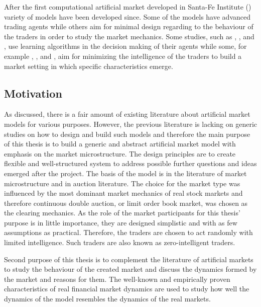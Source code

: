 After the first computational artificial market developed in Santa-Fe Institute
(\citet{SantaFe94}) variety of models have been developed since. Some of the
models have advanced trading agents while others aim for minimal design 
regarding to the behaviour of the traders in order to study the market
mechanics. Some studies, such as \citet{GOYKHMAN20181729}, \citet{IZUMI200535},
\citet{Reinforcement09} and \citet{YEH20102089}, use learning algorithms in the decision making of 
their agents while some, for example \citet{God93}, \citet{Jam96}, \citet{Genoa01} and \citet{Raberto05}, 
aim for minimizing the intelligence of the traders to build a market setting in which
specific characteristics emerge. %



\subsection{Motivation}

As discussed, there is a fair amount of existing literature about artificial market models for various
purposes. However, the previous literature is lacking on generic studies on how to design
and build such models and therefore the main purpose of this thesis is to build a generic and abstract 
artificial market model with emphasis on the market microstructure. The design principles are to create flexible 
and well-structured system to address possible further questions and ideas emerged after the project. 
The basis of the model is in the literature of market microstructure and in auction literature. The choice for the
market type was influenced by the most dominant market mechanics of real stock markets and therefore
continuous double auction, or limit order book market, was chosen as the clearing mechanics. As the 
role of the market participants for this thesis' purpose is in little importance, they are designed
simplistic and with as few assumptions as practical. Therefore, the traders are chosen to act randomly
with limited intelligence. Such traders are also known as zero-intelligent traders. 

Second purpose of this thesis is to complement the literature of artificial markets to study 
the behaviour of the created market and discuss the dynamics formed by the market and reasons for them.
The well-known and empirically proven characteristics of real financial market dynamics are used to 
study how well the dynamics of the model resembles the dynamics of the real markets.

